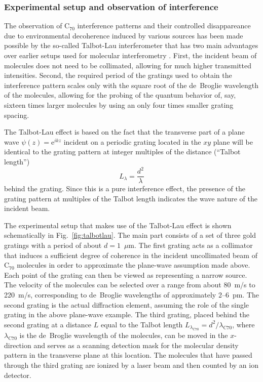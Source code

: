 \documentclass[twocolumn,aps,floatfix,amsmath,amssymb,showpacs,nofootinbib]{revtex4}
\newcommand{\be}{\begin{equation}} \newcommand{\ee}{\end{equation}}
\newcommand{\e}{\ensuremath{\mathrm{e}}}
\begin{document}
\subsubsection{Experimental setup and observation of interference}

The observation of C$_{70}$ interference patterns and their controlled
disappareance due to environmental decoherence induced by various
sources has been made possible by the so-called Talbot-Lau
interferometer \cite{Brezger:2002:mu} that has two main advantages
over earlier setups used for molecular interferometry
\cite{Borde:1994:om,Chapman:1995:bg}. First, the incident beam of
molecules does not need to be collimated, allowing for much higher
transmitted intensities.  Second, the required period of the gratings
used to obtain the interference pattern scales only with the square
root of the de~Broglie wavelength of the molecules, allowing for the
probing of the quantum behavior of, say, sixteen times larger
molecules by using an only four times smaller grating spacing.

The Talbot-Lau effect is based on the fact that the transverse part of
a plane wave $\psi(z) = \e^{ikz}$ incident on a periodic grating
located in the $xy$ plane will be identical to the grating pattern at
integer multiples of the distance (``Talbot length'')
%
\be
L_\lambda = \frac{d^2}{\lambda}
\ee
%
behind the grating. Since this is a pure interference effect, the
presence of the grating pattern at multiples of the Talbot length
indicates the wave nature of the incident beam.

The experimental setup that makes use of the Talbot-Lau effect is
shown schematically in Fig.~\ref{fig:talbotlau}. The main part
consists of a set of three gold gratings with a period of about
$d=1$~$\mu$m. The first grating acts as a collimator that induces a
sufficient degree of coherence in the incident uncollimated beam of
C$_{70}$ molecules in order to approximate the plane-wave assumption
made above. Each point of the grating can then be viewed as
representing a narrow source. The velocity of the molecules can be
selected over a range from about 80~m/s to 220~m/s, corresponding to
de~Broglie wavelengths of approximately 2--6~pm. The second grating is
the actual diffraction element, assuming the role of the single
grating in the above plane-wave example. The third grating, placed
behind the second grating at a distance $L$ equal to the Talbot length
$L_{\lambda_{\text{C}70}} = d^2/\lambda_{\text{C}70}$, where
$\lambda_{\text{C}70}$ is the de~Broglie wavelength of the molecules,
can be moved in the $x$-direction and serves as a scanning detection
mask for the molecular density pattern in the transverse plane at this
location.  The molecules that have passed through the third grating
are ionized by a laser beam and then counted by an ion detector.
\end{document}

